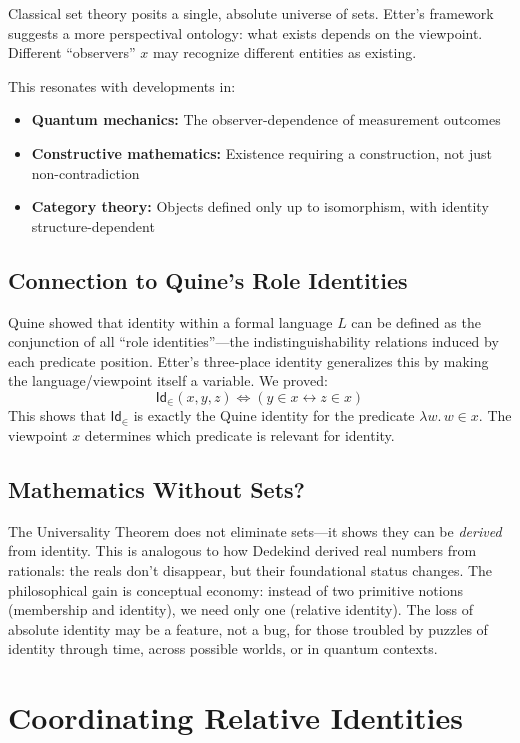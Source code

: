 \documentclass[11pt, a4paper]{article}
\theoremstyle{remark}
\newcommand{\Id}{\mathsf{Id}}
\begin{document}
Classical set theory posits a single, absolute universe of sets. Etter's framework suggests a more perspectival ontology: what exists depends on the viewpoint. Different ``observers'' $x$ may recognize different entities as existing.

This resonates with developments in:
\begin{itemize}
    \item \textbf{Quantum mechanics:} The observer-dependence of measurement outcomes
    \item \textbf{Constructive mathematics:} Existence requiring a construction, not just non-contradiction
    \item \textbf{Category theory:} Objects defined only up to isomorphism, with identity structure-dependent
\end{itemize}

\subsection{Connection to Quine's Role Identities}

Quine showed that identity within a formal language $L$ can be defined as the conjunction of all ``role identities''---the indistinguishability relations induced by each predicate position. Etter's three-place identity generalizes this by making the language/viewpoint itself a variable. We proved:
\[
\Id_\in(x, y, z) \iff (y \in x \leftrightarrow z \in x)
\]
This shows that $\Id_\in$ is exactly the Quine identity for the predicate $\lambda w.\, w \in x$. The viewpoint $x$ determines which predicate is relevant for identity.

\subsection{Mathematics Without Sets?}

The Universality Theorem does not eliminate sets---it shows they can be \emph{derived} from identity. This is analogous to how Dedekind derived real numbers from rationals: the reals don't disappear, but their foundational status changes. The philosophical gain is conceptual economy: instead of two primitive notions (membership and identity), we need only one (relative identity). The loss of absolute identity may be a feature, not a bug, for those troubled by puzzles of identity through time, across possible worlds, or in quantum contexts.

\section{Coordinating Relative Identities}
\end{document}
